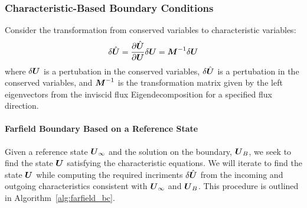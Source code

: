 \subsubsection{Characteristic-Based Boundary Conditions}
Consider the transformation from conserved variables to characteristic variables:
\begin{equation}
\delta\hat{{\boldsymbol{U}}} = {\frac{\partial{\hat{{\boldsymbol{U}}}}}{\partial{{\boldsymbol{U}}}}} \delta{\boldsymbol{U}} = {\boldsymbol{M}}^{-1} \delta{\boldsymbol{U}}
\end{equation}
where $\delta{\boldsymbol{U}}$ is a pertubation in the conserved variables, $\delta\hat{{\boldsymbol{U}}}$ is a pertubation in the conserved variables, and ${\boldsymbol{M}}^{-1}$ is the transformation matrix given by the left eigenvectors from the inviscid flux Eigendecomposition for a specified flux direction.

\paragraph{Farfield Boundary Based on a Reference State}

Given a reference state ${\boldsymbol{U}}_\infty$ and the solution on the boundary, ${\boldsymbol{U}}_B$, we seek to find the state ${\boldsymbol{U}}$ satisfying the characteristic equations.  We will iterate to find the state ${\boldsymbol{U}}$ while computing the required incriments $\delta{\hat{{\boldsymbol{U}}}}$ from the incoming and outgoing characteristics consistent with ${\boldsymbol{U}}_\infty$ and ${\boldsymbol{U}}_B$.  This procedure is outlined in Algorithm~\ref{alg:farfield_bc}.

